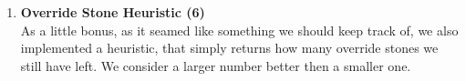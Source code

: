 \begin{enumerate}
\begin{lstlisting}
    for all enemy players:
        result -= amount of choice tiles the enemy could place on * min(enemy_tile_amount - player_tile_amount, 0)

        result += amount of inversion tiles the enemy could place on * enemy_tile_amount - player_tile_amount

    return result;
    
    \end{lstlisting}
    
    \item \textbf{Override Stone Heuristic (6)} \\
    As a little bonus, as it seamed like something we should keep track of, we also implemented a heuristic, that simply returns how many override stones we still have left. We consider a larger number better then a smaller one.
\end{enumerate}
